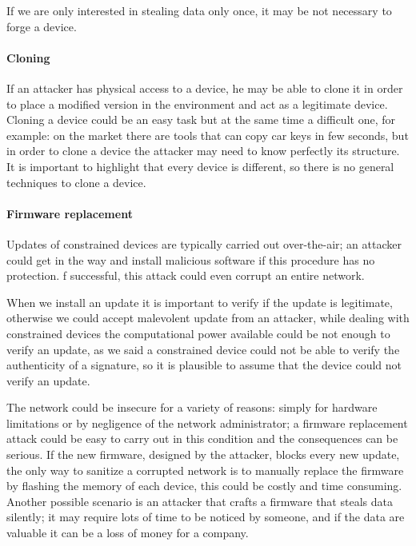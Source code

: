 	If we are only interested in stealing data only once, it may be not necessary to forge a device.\newline
	
	\paragraph{Cloning}
	If an attacker has physical access to a device, he may be able to clone it in order to place a modified version in the environment and act as a legitimate device.\newline
	Cloning a device could be an easy task but at the same time a difficult one, for example: on the market there are tools that can copy car keys in few seconds, but in order to clone a device the attacker may need to know perfectly its structure.
	It is important to highlight that every device is different, so there is no general techniques to clone a device.\newline
	
	\paragraph{Firmware replacement}
	Updates of constrained devices are typically carried out over-the-air; an attacker could get in the way and install malicious software if this procedure has no protection. f successful, this attack could even corrupt an entire network.\newline
	
	When we install an update it is important to verify if the update is legitimate, otherwise we could accept malevolent update from an attacker, while dealing with constrained devices the computational power available could be not enough to verify an update, as we said a constrained device could not be able to verify the authenticity of a signature, so it is plausible to assume that the device could not verify an update.\newline
	
	The network could be insecure for a variety of reasons: simply for hardware limitations or by negligence of the network administrator; a firmware replacement attack could be easy to carry out in this condition and the consequences can be serious. If the new firmware, designed by the attacker, blocks every new update, the only way to sanitize a corrupted network is to manually replace the firmware by flashing the memory of each device, this could be costly and time consuming. Another possible scenario is an attacker that crafts a firmware that steals data silently; it may require lots of time to be noticed by someone, and if the data are valuable it can be a loss of money for a company.\newline
	
